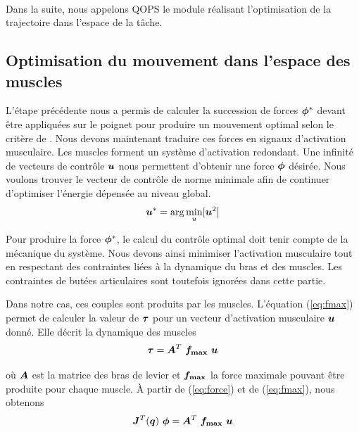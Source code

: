 \documentclass[pdftex,a4paper,11pt]{article}
\begin{document}
\paragraph{}
Dans la suite, nous appelons QOPS le module réalisant l'optimisation de la
trajectoire dans l'espace de la tâche.


\subsection{Optimisation du mouvement dans l'espace des muscles}

L'étape précédente nous a permis de calculer la succession de forces $\boldsymbol{\phi}^*$
devant être appliquées sur le poignet pour produire un mouvement optimal selon le
critère de \cite{rigoux11}.
Nous devons maintenant traduire ces forces en signaux d'activation musculaire.
Les muscles forment un système d'activation redondant. Une infinité de vecteurs
de contrôle $\boldsymbol{u}$ nous permettent d'obtenir une force $\boldsymbol{\phi}$ désirée.
Nous voulons trouver le vecteur de contrôle de norme minimale afin de continuer
d'optimiser l'énergie dépensée au niveau global.
\begin{equation}
    \boldsymbol{u}^* = \arg\min_{u} [\boldsymbol{u}^2]
    \label{eq:muscu_cost}
\end{equation}

Pour produire la force $\boldsymbol{\phi}^*$, le calcul du contrôle optimal doit tenir
compte de la mécanique du système.  Nous devons ainsi minimiser l'activation
musculaire tout en respectant des contraintes liées à la dynamique du bras et
des muscles.  Les contraintes de butées articulaires sont toutefois ignorées
dans cette partie.

Dans notre cas, ces couples sont produits par les muscles.
L'équation (\ref{eq:fmax}) permet de calculer la valeur de $\boldsymbol{\tau}$
pour un vecteur d'activation musculaire $\boldsymbol{u}$ donné.
Elle décrit la dynamique des muscles 
\begin{equation}
    \boldsymbol{\tau} = \boldsymbol{A}^T ~ \boldsymbol{f_{\max}} ~ \boldsymbol{u}
    \label{eq:fmax}
\end{equation}

où $\boldsymbol{A}$ est la matrice des bras de levier et $\boldsymbol{f_{\max}}$
la force maximale pouvant être produite pour chaque muscle.
À partir de (\ref{eq:force}) et de (\ref{eq:fmax}), nous obtenons
\begin{equation}
  \boldsymbol{J}^T(\boldsymbol{q}) ~ \boldsymbol{\phi} = \boldsymbol{A}^T ~ \boldsymbol{f_{\max}} ~ \boldsymbol{u}
\end{equation}
\end{document}

